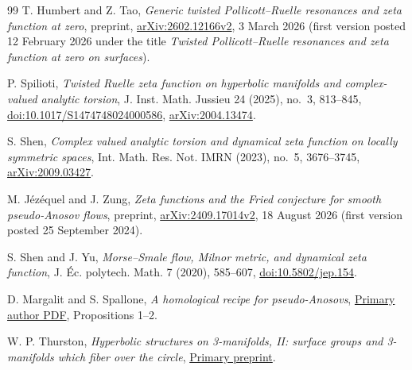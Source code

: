 \documentclass[11pt,letterpaper,reqno]{amsart}
\theoremstyle{remark}
\begin{document}
\begin{thebibliography}{99}
 T. Humbert and Z. Tao,
\emph{Generic twisted Pollicott--Ruelle resonances and zeta function at zero},
preprint, \href{https://arxiv.org/abs/2602.12166v2}{arXiv:2602.12166v2},
3 March 2026 (first version posted 12 February 2026 under the title
\emph{Twisted Pollicott--Ruelle resonances and zeta function at zero on surfaces}).

 P. Spilioti,
\emph{Twisted Ruelle zeta function on hyperbolic manifolds and
complex-valued analytic torsion},
J. Inst. Math. Jussieu 24 (2025), no.~3, 813--845,
\href{https://doi.org/10.1017/S1474748024000586}{doi:10.1017/S1474748024000586},
\href{https://arxiv.org/abs/2004.13474}{arXiv:2004.13474}.

 S. Shen,
\emph{Complex valued analytic torsion and dynamical zeta function on
locally symmetric spaces},
Int. Math. Res. Not. IMRN (2023), no.~5, 3676--3745,
\href{https://arxiv.org/abs/2009.03427}{arXiv:2009.03427}.

 M. J\'ez\'equel and J. Zung,
\emph{Zeta functions and the Fried conjecture for smooth pseudo-Anosov flows},
preprint, \href{https://arxiv.org/abs/2409.17014v2}{arXiv:2409.17014v2},
18 August 2026 (first version posted 25 September 2024).

 S. Shen and J. Yu,
\emph{Morse--Smale flow, Milnor metric, and dynamical zeta function},
J. \'Ec. polytech. Math. 7 (2020), 585--607,
\href{https://doi.org/10.5802/jep.154}{doi:10.5802/jep.154}.

 D. Margalit and S. Spallone,
\emph{A homological recipe for pseudo-Anosovs},
\href{https://margalit.droppages.net/papers/homcrit.pdf}{Primary author PDF},
Propositions 1--2.

 W. P. Thurston,
\emph{Hyperbolic structures on 3-manifolds, II: surface groups and
3-manifolds which fiber over the circle},
\href{https://arxiv.org/abs/math/9801045}{Primary preprint}.
\end{thebibliography}
\end{document}
